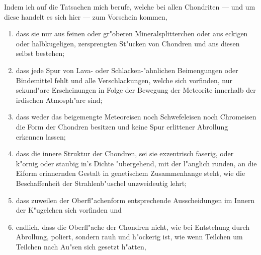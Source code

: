 \documentclass[a4paper, 11pt, oneside]{article}
\begin{document}
Indem ich auf die Tatsachen mich berufe, welche bei allen Chondriten --- und um diese handelt es sich hier --- zum Vorschein kommen,
\begin{enumerate}
    \item dass sie nur aus feinen oder gr"oberen Mineralsplitterchen oder aus eckigen oder halbkugeligen, zersprengten St"ucken von Chondren und ans diesen selbst bestehen;
    \item dass jede Spur von Lava- oder Schlacken-"ahnlichen Beimengungen oder Bindemittel fehlt und alle Verschlackungen, welche sich vorfinden, nur sekund"are Erscheinungen in Folge der Bewegung der Meteorite innerhalb der irdischen Atmosph"are sind;
    \item dass weder das beigemengte Meteoreisen noch Schwefeleisen noch Chromeisen die Form der Chondren besitzen und keine Spur erlittener Abrollung erkennen lassen;
    \item dass die innere Struktur der Chondren, sei sie exzentrisch faserig, oder k"ornig oder staubig in's Dichte "ubergehend, mit der l"anglich runden, an die Eiform erinnernden Gestalt in genetischem Zusammenhange steht, wie die Beschaffenheit der Strahlenb"uschel unzweideutig lehrt;
    \item dass zuweilen der Oberfl"achenform entsprechende Ausscheidungen im Innern der K"ugelchen sich vorfinden und
    \item endlich, dass die Oberfl"ache der Chondren nicht, wie bei Entstehung durch Abrollung, poliert, sondern rauh und h"ockerig ist, wie wenn Teilchen um Teilchen nach Au"sen sich gesetzt h"atten,
\end{enumerate}
\end{document}
